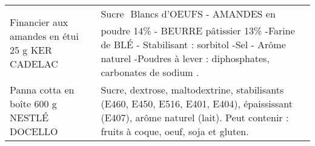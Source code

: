 \begin{longtable}{p{5cm}p{10cm}}
                                                           Financier aux amandes en étui 25 g KER CADELAC &                                                                                                                                                                                                                                                                                                                                                                                                                                                                                                                                                                                                                                                                                                                                                                                                                                               Sucre  Blancs d'OEUFS - AMANDES en poudre 14\% - BEURRE pâtissier 13\% -Farine de BLÉ - Stabilisant : sorbitol -Sel - Arôme naturel -Poudres à lever : diphosphates, carbonates de sodium . \\
                                                                Panna cotta en boîte 600 g NESTLÉ DOCELLO &                                                                                                                                                                                                                                                                                                                                                                                                                                                                                                                                                                                                                                                                                                                                                                                                                                                            Sucre, dextrose, maltodextrine, stabilisants (E460, E450, E516, E401, E404), épaississant (E407), arôme naturel (lait). Peut contenir : fruits à coque, oeuf, soja et gluten. \\

\end{longtable}
